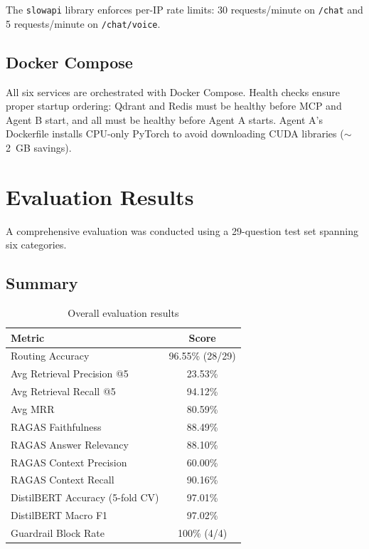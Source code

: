 \documentclass[12pt, a4paper]{article}
\begin{document}
The \texttt{slowapi} library enforces per-IP rate limits: 30 requests/minute on \texttt{/chat} and 5 requests/minute on \texttt{/chat/voice}.

\subsection{Docker Compose}

All six services are orchestrated with Docker Compose. Health checks ensure proper startup ordering: Qdrant and Redis must be healthy before MCP and Agent B start, and all must be healthy before Agent A starts. Agent A's Dockerfile installs CPU-only PyTorch to avoid downloading CUDA libraries ($\sim$2~GB savings).

\section{Evaluation Results}

A comprehensive evaluation was conducted using a 29-question test set spanning six categories.

\subsection{Summary}

\begin{table}[H]
\centering
\caption{Overall evaluation results}
\begin{tabular}{l c}
\toprule
\textbf{Metric} & \textbf{Score} \\
\midrule
Routing Accuracy & 96.55\% (28/29) \\
Avg Retrieval Precision @5 & 23.53\% \\
Avg Retrieval Recall @5 & 94.12\% \\
Avg MRR & 80.59\% \\
RAGAS Faithfulness & 88.49\% \\
RAGAS Answer Relevancy & 88.10\% \\
RAGAS Context Precision & 60.00\% \\
RAGAS Context Recall & 90.16\% \\
DistilBERT Accuracy (5-fold CV) & 97.01\% \\
DistilBERT Macro F1 & 97.02\% \\
Guardrail Block Rate & 100\% (4/4) \\
\bottomrule
\end{tabular}
\label{tab:summary}
\end{table}
\end{document}
